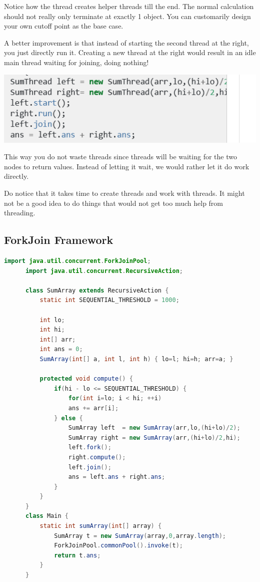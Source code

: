 \documentclass[letterpaper,12pt]{article}
\begin{document}
Notice how the thread creates helper threads till the end. The normal calculation should not really only terminate at exactly 1 object. You can customarily design your own cutoff point as the base case.

A better improvement is that instead of starting the second thread at the right, you just directly run it. Creating a new thread at the right would result in an idle main thread waiting for joining, doing nothing!

\includegraphics*{summary_image/Divide and Conequer algorithm improved}

This way you do not waste threads since threads will be waiting for the two nodes to return values. Instead of letting it wait, we would rather let it do work directly.

Do notice that it takes time to create threads and work with threads. It might not be a good idea to do things that would not get too much help from threading.

\subsection{ForkJoin Framework}
\begin{lstlisting}[language=Java]
      import java.util.concurrent.ForkJoinPool;
      import java.util.concurrent.RecursiveAction;
      
      class SumArray extends RecursiveAction {
          static int SEQUENTIAL_THRESHOLD = 1000;
      
          int lo;
          int hi;
          int[] arr;
          int ans = 0;
          SumArray(int[] a, int l, int h) { lo=l; hi=h; arr=a; }
      
          protected void compute() {
              if(hi - lo <= SEQUENTIAL_THRESHOLD) {
                  for(int i=lo; i < hi; ++i)
                  ans += arr[i];
              } else {
                  SumArray left  = new SumArray(arr,lo,(hi+lo)/2);
                  SumArray right = new SumArray(arr,(hi+lo)/2,hi);
                  left.fork();
                  right.compute();
                  left.join();
                  ans = left.ans + right.ans;
              }
          }
      }
      class Main {
          static int sumArray(int[] array) {
              SumArray t = new SumArray(array,0,array.length);
              ForkJoinPool.commonPool().invoke(t);
              return t.ans;
          }
      }

\end{lstlisting}
\end{document}
